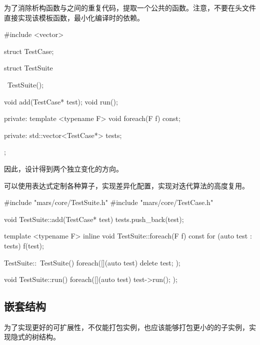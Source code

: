 \begin{content}
为了消除析构函数与之间的重复代码，提取一个公共的函数。注意，不要在头文件直接实现该模板函数，最小化编译时的依赖。

\begin{leftbar}
 \begin{c++}[caption={\ttfamily{include/mars/core/TestSuite.h}}]
#include <vector>

struct TestCase;

struct TestSuite {
  ~TestSuite();

  void add(TestCase* test);
  void run();

private:
  template <typename F>
  void foreach(F f) const;

private:
  std::vector<TestCase*> tests;
};
 \end{c++}
\end{leftbar}

因此，设计得到两个独立变化的方向。

\begin{enum}
\end{enum}

可以使用表达式定制各种算子，实现差异化配置，实现对迭代算法的高度复用。

\begin{leftbar}
 \begin{c++}[caption={\ttfamily{src/mars/core/TestSuite.cc}}]
#include "mars/core/TestSuite.h"
#include "mars/core/TestCase.h"

void TestSuite::add(TestCase* test) {
  tests.push_back(test);
}

template <typename F>
inline void TestSuite::foreach(F f) const {
  for (auto test : tests) {
    f(test);
  }
}

TestSuite::~TestSuite() {
  foreach([](auto test) {
    delete test;
  });
}

void TestSuite::run() {
  foreach([](auto test) {
    test->run();
  });
}
 \end{c++}
\end{leftbar}

\subsection{嵌套结构}

为了实现更好的可扩展性，不仅能打包实例，也应该能够打包更小的的子实例，实现隐式的树结构。



\end{content}
